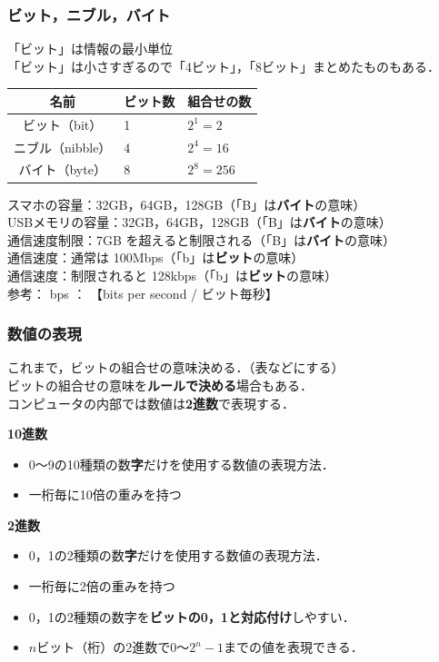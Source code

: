\documentclass[handout]{beamer}        %
\begin{document}
\begin{frame}
  \frametitle{ビット，ニブル，バイト}
  「ビット」は情報の最小単位 \\
  「ビット」は小さすぎるので「4ビット」，「8ビット」まとめたものもある．

  \begin{center}
    \begin{tabular}{c|l|l} \hline\hline
      名前 & ビット数 & 組合せの数\\
      \hline
      ビット（bit）    & 1   & $2^1 = 2$ \\
      ニブル（nibble） & 4   & $2^4 = 16$ \\
      バイト（byte） & 8   & $2^8 = 256$ \\
    \end{tabular}
  \end{center}

  スマホの容量：32GB，64GB，128GB（「B」は{\bf バイト}の意味） \\
  USBメモリの容量：32GB，64GB，128GB（「B」は{\bf バイト}の意味） \\
  通信速度制限：7GB を超えると制限される（「B」は{\bf バイト}の意味） \\
  通信速度：通常は 100Mbps（「b」は{\bf ビット}の意味） \\
  通信速度：制限されると 128kbps（「b」は{\bf ビット}の意味） \\

  参考： bps ： 【bits per second / ビット毎秒】
\end{frame}

\begin{frame}
  \frametitle{数値の表現}
  これまで，ビットの組合せの意味決める．（表などにする） \\
  ビットの組合せの意味を{\bf ルールで決める}場合もある．\\
  コンピュータの内部では数値は{\bf 2進数}で表現する．

  {\bf 10進数} \\
  \begin{itemize}
    \item 0〜9の10種類の数{\bf 字}だけを使用する数値の表現方法．
    \item 一桁毎に10倍の重みを持つ
  \end{itemize}

  {\bf 2進数} \\
  \begin{itemize}
    \item 0，1の2種類の数{\bf 字}だけを使用する数値の表現方法．
    \item 一桁毎に2倍の重みを持つ
    \item 0，1の2種類の数字を{\bf ビットの0，1と対応付け}しやすい．
    \item $n$ビット（桁）の2進数で$0$〜$2^n-1$までの値を表現できる．
  \end{itemize}

\end{frame}
\end{document}
